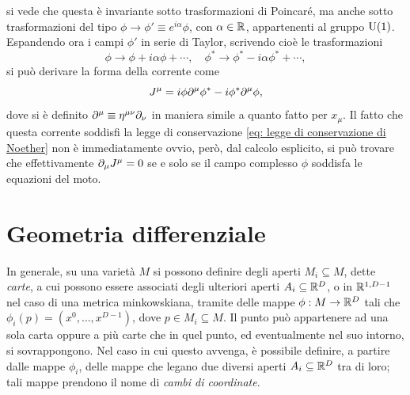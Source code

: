 si vede che questa è invariante sotto trasformazioni di Poincaré, ma anche sotto trasformazioni del tipo $\phi \to \phi' \equiv e^{i\alpha}\phi$, con $\alpha \in \mathbb{R}$, appartenenti al gruppo $\mathrm{U}(1)$. Espandendo ora i campi $\phi'$ in serie di Taylor, scrivendo cioè le trasformazioni
\begin{equation}
    \phi \to \phi + i\alpha\phi + \cdots,\quad \phi^* \to \phi^* - i\alpha\phi^* + \cdots,
\end{equation}
si può derivare la forma della corrente come
\begin{equation}
    J^\mu = i\phi\partial^\mu\phi^* - i\phi^*\partial^\mu\phi,
\end{equation}
dove si è definito $\partial^\mu \equiv \eta^{\mu\nu}\partial_\nu$ in maniera simile a quanto fatto per $x_\mu$. Il fatto che questa corrente soddisfi la legge di conservazione \eqref{eq: legge di conservazione di Noether} non è immediatamente ovvio, però, dal calcolo esplicito, si può trovare che effettivamente $\partial_\mu J^\mu = 0$ se e solo se il campo complesso $\phi$ soddisfa le equazioni del moto. 

\section{Geometria differenziale}
In generale, su una varietà $M$ si possono definire degli aperti $M_i \subseteq M$, dette \emph{carte}, a cui possono essere associati degli ulteriori aperti $A_i \subseteq \mathbb{R}^D$, o in $\mathbb{R}^{1,D - 1}$ nel caso di una metrica minkowskiana, tramite delle mappe $\phi : M \to \mathbb{R}^D$ tali che $\phi_i(p) = (x^0,\dots,x^{D - 1})$, dove $p \in M_i \subseteq M$. Il punto può appartenere ad una sola carta oppure a più carte che in quel punto, ed eventualmente nel suo intorno, si sovrappongono. Nel caso in cui questo avvenga, è possibile definire, a partire dalle mappe $\phi_i$, delle mappe che legano due diversi aperti $A_i \subseteq \mathbb{R}^D$ tra di loro; tali mappe prendono il nome di \emph{cambi di coordinate}. 

